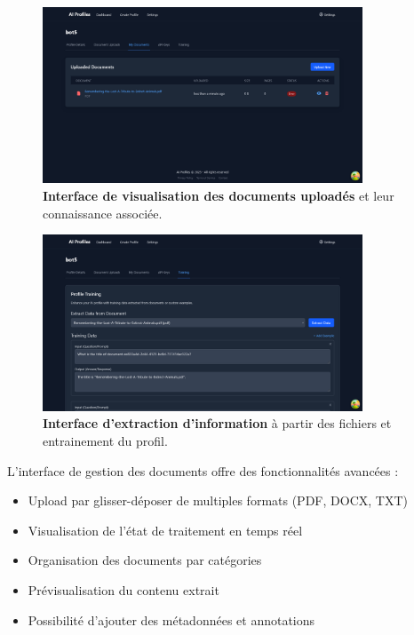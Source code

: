 \begin{figure}[H]
  \centering
  \includegraphics[width=0.85\textwidth,keepaspectratio]{pfe-pics/ai-profile-creation/see_upladed_documents_knoladge.png}
  \caption{\textbf{Interface de visualisation des documents uploadés} et leur connaissance associée.}
  \label{fig:document_knowledge}
\end{figure}

\begin{figure}[H]
  \centering
  \includegraphics[width=0.85\textwidth,keepaspectratio]{pfe-pics/ai-profile-creation/extract_info_from_file_and_training_pfrile.png}
  \caption{\textbf{Interface d'extraction d'information} à partir des fichiers et entrainement du profil.}
  \label{fig:document_extraction}
\end{figure}

L'interface de gestion des documents offre des fonctionnalités avancées :

\begin{itemize}
  \item Upload par glisser-déposer de multiples formats (PDF, DOCX, TXT)
  \item Visualisation de l'état de traitement en temps réel
  \item Organisation des documents par catégories
  \item Prévisualisation du contenu extrait
  \item Possibilité d'ajouter des métadonnées et annotations
\end{itemize}

